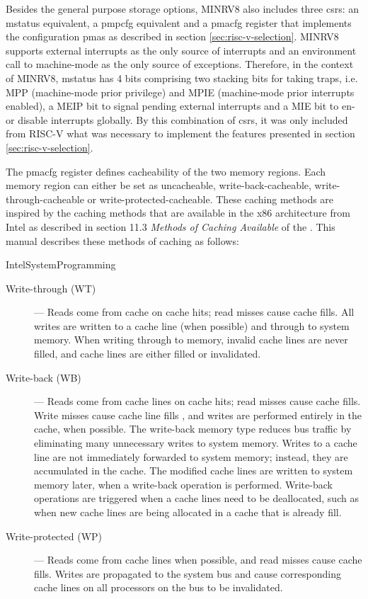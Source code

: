 Besides the general purpose storage options, MINRV8 also includes three \glspl{csr}: an \gls{mstatus} equivalent, a \gls{pmpcfg} equivalent and a \gls{pmacfg} register that implements the configuration \glspl{pma} as described in section \ref{sec:risc-v-selection}.
MINRV8 supports external interrupts as the only source of interrupts and an environment call to machine-mode as the only source of exceptions.
Therefore, in the context of MINRV8, \gls{mstatus} has 4 bits comprising two stacking bits for taking traps, i.e. MPP (machine-mode prior privilege) and MPIE (machine-mode prior interrupts enabled), a MEIP bit to signal pending external interrupts and a MIE bit to en- or disable interrupts globally.
By this combination of \glspl{csr}, it was only included from RISC-V what was necessary to implement the features presented in section \ref{sec:risc-v-selection}.

The \gls{pmacfg} register defines cacheability of the two memory regions.
Each memory region can either be set as uncacheable, write-back-cacheable, write-through-cacheable or write-protected-cacheable.
These caching methods are inspired by the caching methods that are available in the x86 architecture from Intel as described in section 11.3 \textit{Methods of Caching Available} of the  \cite{IntelSystemProgramming}.
This manual describes these methods of caching as follows:
\begin{displaycquote}[p.11-7]{IntelSystemProgramming}
    \begin{description}
        \item[Write-through (WT)] --- \textelp{} Reads come from cache on cache hits; read misses cause cache fills. \textelp{}
        All writes are written to a cache line (when possible) and through to system memory.
        When writing through to memory, invalid cache lines are never filled, and cache lines are either filled or invalidated. \textelp{}
        \item[Write-back (WB)] --- \textelp{} Reads come from cache lines on cache hits; read misses cause cache fills. \textelp{}
        Write misses cause cache line fills \textelp{}, and writes are performed entirely in the cache, when possible. \textelp{}
        The write-back memory type reduces bus traffic by eliminating many unnecessary writes to system memory.
        Writes to a cache line are not immediately forwarded to system memory; instead, they are accumulated in the cache.
        The modified cache lines are written to system memory later, when a write-back operation is performed.
        Write-back operations are triggered when a cache lines need to be deallocated, such as when new cache lines are being allocated in a cache that is already fill. \textelp{}
        \item[Write-protected (WP)] --- Reads come from cache lines when possible, and read misses cause cache fills.
        Writes are propagated to the system bus and cause corresponding cache lines on all processors on the bus to be invalidated.
        \textelp{}
    \end{description}
\end{displaycquote}

